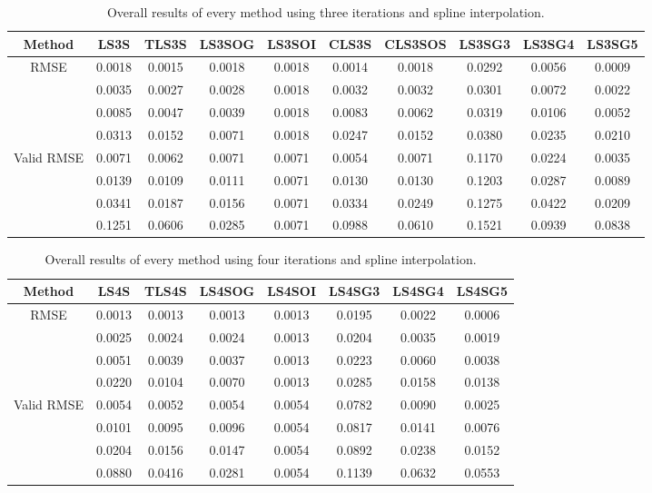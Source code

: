 \begin{table}[ht!]
\centering
\begin{tabular}{c|c|c|c|c|c|c|c|c|c}
Method & \scriptsize{LS3S} & \scriptsize{TLS3S} & \scriptsize{LS3SOG} & \scriptsize{LS3SOI} & \scriptsize{CLS3S} & \scriptsize{CLS3SOS} & \scriptsize{LS3SG3} & \scriptsize{LS3SG4} & \scriptsize{LS3SG5}\\ \hline 
\multirow{4}{*}{RMSE} & 0.0018 & 0.0015 & 0.0018 & 0.0018 & 0.0014 & 0.0018 & 0.0292 & 0.0056 & 0.0009 \\ 
 & 0.0035 & 0.0027 & 0.0028 & 0.0018 & 0.0032 & 0.0032 & 0.0301 & 0.0072 & 0.0022 \\ 
 & 0.0085 & 0.0047 & 0.0039 & 0.0018 & 0.0083 & 0.0062 & 0.0319 & 0.0106 & 0.0052 \\ 
 & 0.0313 & 0.0152 & 0.0071 & 0.0018 & 0.0247 & 0.0152 & 0.0380 & 0.0235 & 0.0210 \\ 
 \hline
\multirow{4}{*}{Valid RMSE} & 0.0071 & 0.0062 & 0.0071 & 0.0071 & 0.0054 & 0.0071 & 0.1170 & 0.0224 & 0.0035 \\ 
 & 0.0139 & 0.0109 & 0.0111 & 0.0071 & 0.0130 & 0.0130 & 0.1203 & 0.0287 & 0.0089 \\ 
 & 0.0341 & 0.0187 & 0.0156 & 0.0071 & 0.0334 & 0.0249 & 0.1275 & 0.0422 & 0.0209 \\ 
 & 0.1251 & 0.0606 & 0.0285 & 0.0071 & 0.0988 & 0.0610 & 0.1521 & 0.0939 & 0.0838 \\ 
 \hline 
\end{tabular}
\caption{Overall results of every method using three iterations and spline interpolation.}
\label{tab:3itS}
\end{table}


\begin{table}[ht!]
\centering
\begin{tabular}{c|c|c|c|c|c|c|c}
Method & \scriptsize{LS4S} & \scriptsize{TLS4S} & \scriptsize{LS4SOG} & \scriptsize{LS4SOI} & \scriptsize{LS4SG3} & \scriptsize{LS4SG4} & \scriptsize{LS4SG5}\\ \hline 
\multirow{4}{*}{RMSE} & 0.0013 & 0.0013 & 0.0013 & 0.0013 & 0.0195 & 0.0022 & 0.0006 \\ 
 & 0.0025 & 0.0024 & 0.0024 & 0.0013 & 0.0204 & 0.0035 & 0.0019 \\ 
 & 0.0051 & 0.0039 & 0.0037 & 0.0013 & 0.0223 & 0.0060 & 0.0038 \\ 
 & 0.0220 & 0.0104 & 0.0070 & 0.0013 & 0.0285 & 0.0158 & 0.0138 \\ 
 \hline
\multirow{4}{*}{Valid RMSE} & 0.0054 & 0.0052 & 0.0054 & 0.0054 & 0.0782 & 0.0090 & 0.0025 \\ 
 & 0.0101 & 0.0095 & 0.0096 & 0.0054 & 0.0817 & 0.0141 & 0.0076 \\ 
 & 0.0204 & 0.0156 & 0.0147 & 0.0054 & 0.0892 & 0.0238 & 0.0152 \\ 
 & 0.0880 & 0.0416 & 0.0281 & 0.0054 & 0.1139 & 0.0632 & 0.0553 \\ 
 \hline 
\end{tabular}
\caption{Overall results of every method using four iterations and spline interpolation.}
\label{tab:4itS}
\end{table}


